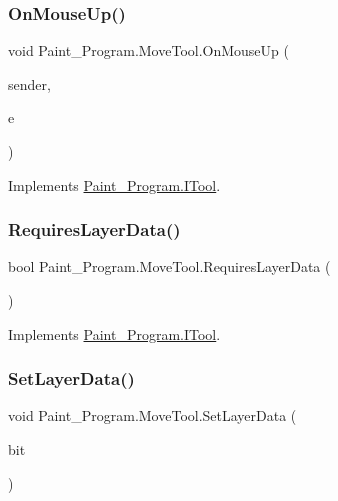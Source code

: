 \subsubsection{\texorpdfstring{On\+Mouse\+Up()}{OnMouseUp()}}
{\footnotesize\ttfamily void Paint\+\_\+\+Program.\+Move\+Tool.\+On\+Mouse\+Up (\begin{DoxyParamCaption}\item[{object}]{sender,  }\item[{Mouse\+Event\+Args}]{e }\end{DoxyParamCaption})\hspace{0.3cm}{\ttfamily [inline]}}



Implements \mbox{\hyperlink{interface_paint___program_1_1_i_tool_a47984c2879213022f1684c07f7bba73e}{Paint\+\_\+\+Program.\+I\+Tool}}.

\mbox{\label{class_paint___program_1_1_move_tool_ad2ef8810a173274af16797143eae1d79}} 
\subsubsection{\texorpdfstring{Requires\+Layer\+Data()}{RequiresLayerData()}}
{\footnotesize\ttfamily bool Paint\+\_\+\+Program.\+Move\+Tool.\+Requires\+Layer\+Data (\begin{DoxyParamCaption}{ }\end{DoxyParamCaption})\hspace{0.3cm}{\ttfamily [inline]}}



Implements \mbox{\hyperlink{interface_paint___program_1_1_i_tool_a6d45b6c48da8130ae41db3a66cdaef9a}{Paint\+\_\+\+Program.\+I\+Tool}}.

\mbox{\label{class_paint___program_1_1_move_tool_a3347f2d4d15477e9c9822ea8660dfc7d}} 
\subsubsection{\texorpdfstring{Set\+Layer\+Data()}{SetLayerData()}}
{\footnotesize\ttfamily void Paint\+\_\+\+Program.\+Move\+Tool.\+Set\+Layer\+Data (\begin{DoxyParamCaption}\item[{Bitmap}]{bit }\end{DoxyParamCaption})\hspace{0.3cm}{\ttfamily [inline]}}



